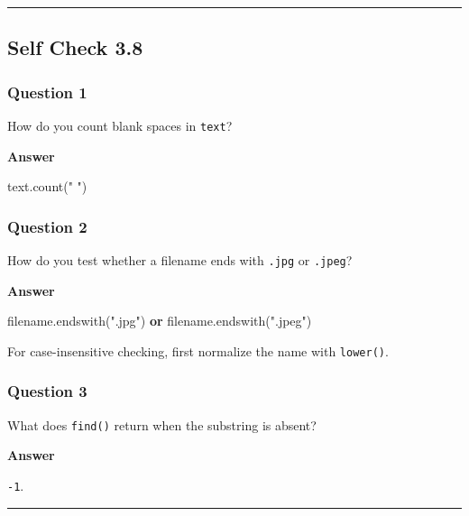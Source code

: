 \documentclass[
  11pt,
  a4paper,
]{article}
\newenvironment{Shaded}{}{}
\newcommand{\KeywordTok}[1]{\textcolor[rgb]{0.00,0.44,0.13}{\textbf{#1}}}
\newcommand{\NormalTok}[1]{#1}
\newcommand{\StringTok}[1]{\textcolor[rgb]{0.25,0.44,0.63}{#1}}
\begin{document}
\begin{center}\rule{0.5\linewidth}{0.5pt}\end{center}

\subsection{Self Check 3.8}\label{self-check-3.8}

\subsubsection{Question 1}\label{question-1-7}

How do you count blank spaces in \texttt{text}?

\textbf{Answer}

\begin{Shaded}
\begin{Highlighting}[]
\NormalTok{text.count(}\StringTok{" "}\NormalTok{)}
\end{Highlighting}
\end{Shaded}

\subsubsection{Question 2}\label{question-2-7}

How do you test whether a filename ends with \texttt{.jpg} or
\texttt{.jpeg}?

\textbf{Answer}

\begin{Shaded}
\begin{Highlighting}[]
\NormalTok{filename.endswith(}\StringTok{".jpg"}\NormalTok{) }\KeywordTok{or}\NormalTok{ filename.endswith(}\StringTok{".jpeg"}\NormalTok{)}
\end{Highlighting}
\end{Shaded}

For case-insensitive checking, first normalize the name with
\texttt{lower()}.

\subsubsection{Question 3}\label{question-3-4}

What does \texttt{find()} return when the substring is absent?

\textbf{Answer}

\texttt{-1}.

\begin{center}\rule{0.5\linewidth}{0.5pt}\end{center}
\end{document}
